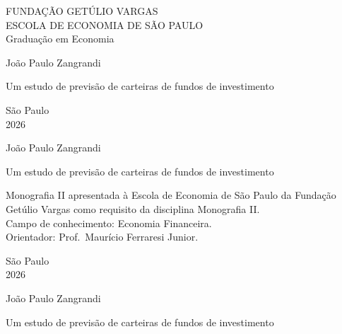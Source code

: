 \documentclass[12pt,a4paper]{article}
\begin{document}
\pagestyle{empty}
\begin{center}
{\large FUNDAÇÃO GETÚLIO VARGAS}\\[2pt]
{\large ESCOLA DE ECONOMIA DE SÃO PAULO}\\[16pt]
{\normalsize Graduação em Economia}

\vspace{4.5cm}

{\large João Paulo Zangrandi}

\vspace{3cm}

{\Large Um estudo de previsão de carteiras de fundos de investimento}

\vfill

{\normalsize São Paulo}\\
{\normalsize 2026}
\end{center}

\newpage

\setcounter{page}{1}
\begin{center}
{\large João Paulo Zangrandi}

\vspace{4cm}

{\Large Um estudo de previsão de carteiras de fundos de investimento}

\vspace{3cm}

\begin{flushright}
\begin{minipage}{0.62\textwidth}
\small{}
Monografia II apresentada à Escola de Economia de São Paulo da Fundação Getúlio
Vargas como requisito da disciplina Monografia II.
\\[10pt]
Campo de conhecimento: Economia Financeira.
\\[10pt]
Orientador: Prof.\ Maurício Ferraresi Junior.
\end{minipage}
\end{flushright}

\vfill

{\normalsize São Paulo}\\
{\normalsize 2026}
\end{center}

\newpage

\begin{center}
{\large João Paulo Zangrandi}

\vspace{2.5cm}

{\Large Um estudo de previsão de carteiras de fundos de investimento}
\end{center}
\end{document}
